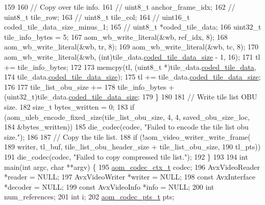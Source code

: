 \begin{DoxyCodeInclude}
{159 
160     \textcolor{comment}{// Copy over tile info.}
161     \textcolor{comment}{//  uint8\_t anchor\_frame\_idx;}
162     \textcolor{comment}{//  uint8\_t tile\_row;}
163     \textcolor{comment}{//  uint8\_t tile\_col;}
164     \textcolor{comment}{//  uint16\_t coded\_tile\_data\_size\_minus\_1;}
165     \textcolor{comment}{//  uint8\_t *coded\_tile\_data;}
166     uint32\_t tile\_info\_bytes = 5;
167     aom\_wb\_write\_literal(&wb, ref\_idx, 8);
168     aom\_wb\_write\_literal(&wb, tr, 8);
169     aom\_wb\_write\_literal(&wb, tc, 8);
170     aom\_wb\_write\_literal(&wb, (\textcolor{keywordtype}{int})tile\_data.\hyperlink{structaom__tile__data_a4451b0bcd81b4959484745df35a9fbba}{coded\_tile\_data\_size} - 1, 16);
171     tl += tile\_info\_bytes;
172 
173     memcpy(tl, (uint8\_t *)tile\_data.\hyperlink{structaom__tile__data_a05898249ddaf5ba799dd471113b0e51e}{coded\_tile\_data},
174            tile\_data.\hyperlink{structaom__tile__data_a4451b0bcd81b4959484745df35a9fbba}{coded\_tile\_data\_size});
175     tl += tile\_data.\hyperlink{structaom__tile__data_a4451b0bcd81b4959484745df35a9fbba}{coded\_tile\_data\_size};
176 
177     tile\_list\_obu\_size +=
178         tile\_info\_bytes + (uint32\_t)tile\_data.\hyperlink{structaom__tile__data_a4451b0bcd81b4959484745df35a9fbba}{coded\_tile\_data\_size};
179   \}
180 
181   \textcolor{comment}{// Write tile list OBU size.}
182   \textcolor{keywordtype}{size\_t} bytes\_written = 0;
183   \textcolor{keywordflow}{if} (aom\_uleb\_encode\_fixed\_size(tile\_list\_obu\_size, 4, 4, saved\_obu\_size\_loc,
184                                  &bytes\_written))
185     die\_codec(codec, \textcolor{stringliteral}{"Failed to encode the tile list obu size."});
186 
187   \textcolor{comment}{// Copy the tile list.}
188   \textcolor{keywordflow}{if} (!aom\_video\_writer\_write\_frame(
189           writer, tl\_buf, tile\_list\_obu\_header\_size + tile\_list\_obu\_size,
190           tl\_pts))
191     die\_codec(codec, \textcolor{stringliteral}{"Failed to copy compressed tile list."});
192 \}
193 
194 \textcolor{keywordtype}{int} main(\textcolor{keywordtype}{int} argc, \textcolor{keywordtype}{char} **argv) \{
195   \hyperlink{structaom__codec__ctx}{aom\_codec\_ctx\_t} codec;
196   AvxVideoReader *reader = NULL;
197   AvxVideoWriter *writer = NULL;
198   \textcolor{keyword}{const} AvxInterface *decoder = NULL;
199   \textcolor{keyword}{const} AvxVideoInfo *info = NULL;
200   \textcolor{keywordtype}{int} num\_references;
201   \textcolor{keywordtype}{int} i;
202   \hyperlink{group__encoder_ga958524226c9a65251c9e4f7bb78fc606}{aom\_codec\_pts\_t} pts;
}
\end{DoxyCodeInclude}
